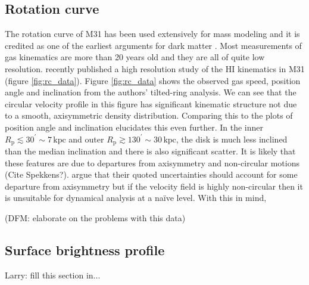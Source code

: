 \documentclass[preprint]{aastex}
\newcommand{\Fig}[1]{Figure \ref{fig:#1}}
\newcommand{\Rband}{\emph{R}-band}
\newcommand{\unit}[1]{\,\mathrm{#1}}
\newcommand{\kpc}{\unit{kpc}}
\begin{document}
\subsection{Rotation curve}

\label{sect:rcdata}

The rotation curve of M31 has been used extensively for mass modeling and it is
credited as one of the earliest arguments for dark matter \citep{Rubin:1970}.
Most measurements of gas kinematics are more than 20 years old and they are all
of quite low resolution.  \citet{Chemin:2009} recently published a high resolution
study of the HI kinematics in M31 (figure \ref{fig:rc_data}).  \Fig{rc_data}
shows the observed gas speed, position angle and inclination from the authors'
tilted-ring analysis.  We can see that the circular velocity profile in this
figure has significant kinematic structure not due to a smooth, axisymmetric
density distribution.  Comparing this to the plots of position angle and inclination
elucidates this even further.  In the inner $R_\mathrm{p} \lesssim 30^\prime \sim 7 \kpc$
and outer $R_\mathrm{p} \gtrsim 130^\prime \sim 30 \kpc$, the disk is much less
inclined than the median inclination and there is also significant scatter.
It is likely that these features are due to departures from axisymmetry and
non-circular motions (Cite Spekkens?).  \citet{Chemin:2009} argue that their
quoted uncertainties should account for some departure from axisymmetry but if
the velocity field is highly non-circular then it is unsuitable for dynamical
analysis at a na\"ive level.  With this in mind,


(DFM: elaborate on the problems with this data)


\subsection{Surface brightness profile}

Larry: fill this section in...

\end{document}
